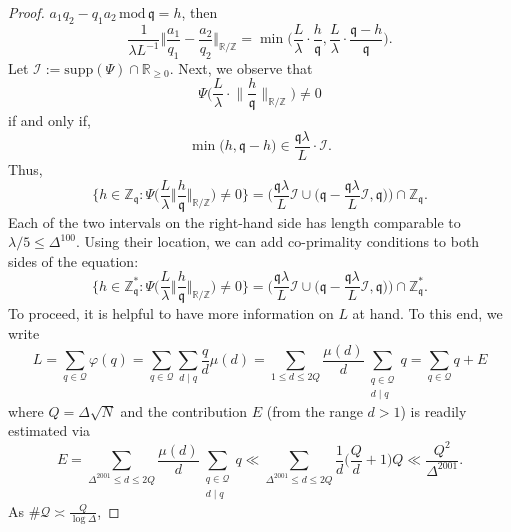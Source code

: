 \documentclass[12pt,reqno]{amsart}
\theoremstyle{plain}
\numberwithin{equation}{section}
\numberwithin{figure}{section}
\theoremstyle{plain}
\theoremstyle{definition}
\theoremstyle{remark}
\begin{document}
\begin{proof}
$ a_1 q_2 - q_1 a_2 \,\mathrm{mod}\, \mathfrak{q} = h$, then
$$
\frac{1}{\lambda L^{-1}}
\Big \Vert \frac{a_1}{q_1} - 
\frac{a_2}{q_2} \Big\Vert_{\mathbb{R}/\mathbb{Z}}
= 
\min\Big( \frac{L}{\lambda}\cdot \frac{h}{\mathfrak{q}},
 \frac{L}{\lambda}\cdot  \frac{\mathfrak{q}-h}{\mathfrak{q}} \Big).
$$
Let $\mathcal{I}:=\mathrm{supp}(\Psi) \cap \mathbb{R}_{\geq 0}$. Next, we 
observe that
$$
\Psi \Big ( \frac{L}{\lambda} \cdot \Big \| \frac{h}{\mathfrak{q}} \Big \|_{\mathbb{R} / \mathbb{Z}} \Big ) \neq 0
$$
if and only if,
$$
\min \Big (h, \mathfrak{q} - h \Big ) \in \frac{\mathfrak{q} \lambda}{L} \cdot \mathcal{I}.
$$
Thus,
$$
\Bigg\{h \in \mathbb{Z}_\mathfrak{q}: 
\Psi\Big( \frac{L}{\lambda}
\Big \Vert \frac{h}{\mathfrak{q}} 
\Big\Vert_{\mathbb{R}/\mathbb{Z}}\Big)
\neq 0
\Bigg\}
=
\Big(\frac{\mathfrak{q} \lambda}{L}
\mathcal{I}\cup 
\big(\mathfrak{q} - 
\frac{\mathfrak{q} \lambda}{L} \mathcal{I},
\mathfrak{q}\big)\Big)
\cap \mathbb{Z}_\mathfrak{q}.
$$
Each of the two intervals on the right-hand side has length comparable to
$\lambda/5 \leq \Delta^{100}$.
Using their location, we can add co-primality conditions to
both sides of the equation:
$$
\Bigg\{h \in \mathbb{Z}_\mathfrak{q}^*: 
\Psi\Big( \frac{L}{\lambda} \Big \Vert  
\frac{h}{\mathfrak{q}} \Big\Vert_{\mathbb{R}/\mathbb{Z}}\Big)
\neq 0
\Bigg\}
=
\Big(\frac{\mathfrak{q}\lambda}{L}
\mathcal{I}\cup 
\big(\mathfrak{q} - 
\frac{\mathfrak{q} \lambda}{L}\mathcal{I},
\mathfrak{q}\big)\Big)
\cap \mathbb{Z}^*_\mathfrak{q}.
$$
To proceed, it is helpful to have more information 
on $L$ at hand. To this end, we write 
$$
L = \sum_{q \in \mathcal{Q}} \varphi(q) = \sum_{q\in \mathcal{Q}} \sum_{d\mid q} \frac{q}{d} \mu (d)
=\sum_{1 \leq  d \leq 2Q} 
 \frac{\mu (d)}{d}
\sum_{
\substack{q\in \mathcal{Q}\\
d\mid q}}  q
= 
\sum_{q\in \mathcal{Q}}  q
+ 
E
$$
where $Q = \Delta \sqrt{N}$ and the contribution $E$ (from the range $d>1$) is readily estimated via
$$
E= 
\sum_{\Delta^{2001} \leq  d \leq 2Q} 
 \frac{\mu (d)}{d}
\sum_{
\substack{q\in \mathcal{Q}\\
d\mid q}}  q\ll 
\sum_{\Delta^{2001} \leq d \leq 2Q} 
 \frac{1}{d}
\Big( \frac{Q}{d} + 1 \Big) Q
\ll \frac{Q^2}{\Delta^{2001}}.
$$
As
$\#\mathcal{Q}\asymp \frac{Q}{\log \Delta}$,

\end{proof}
\end{document}

